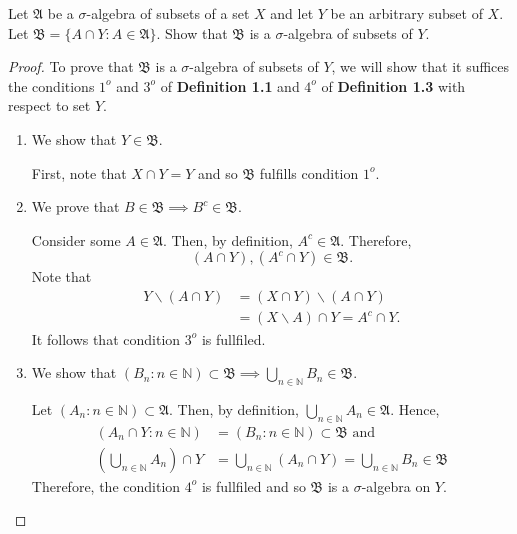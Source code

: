 \documentclass[12pt]{article}
\newcommand{\N}{\mathbb{N}}
\newenvironment{problem}[2][Problem]{\begin{trivlist}
		\item[\hskip \labelsep {\bfseries #1}\hskip \labelsep {\bfseries #2.}]}{\end{trivlist}}
\begin{document}
\begin{problem}{1.7}
	Let $\mathfrak{A}$ be a $\sigma$-algebra of subsets of a set $X$ and let $Y$ be an arbitrary subset of $X$. Let $\mathfrak{B} = \{A\cap Y : A\in \mathfrak{A}\}$. Show that $\mathfrak{B}$ is a $\sigma$-algebra of subsets of $Y$.
	\begin{proof}
	
		To prove that $\mathfrak{B}$ is a $\sigma$-algebra of subsets of $Y$, we will show that it suffices the conditions $1^{o}$ and $3^{o}$ of \textbf{Definition 1.1} and $4^{o}$ of \textbf{Definition 1.3} with respect to set $Y$.
		\begin{enumerate}
		\item We show that $Y\in \mathfrak{B}$.
		
		 First, note that $X\cap Y = Y$ and so $\mathfrak{B}$ fulfills condition $1^{o}$.\\
		
		\item We prove that $B\in \mathfrak{B} \implies B^{c} \in \mathfrak{B}$.
		
		Consider some $A\in \mathfrak{A}$. Then, by definition, $A^{c} \in \mathfrak{A}$. Therefore, 
		\begin{equation*}
		(A\cap Y), (A^{c}\cap Y) \in \mathfrak{B}.
		\end{equation*}
		 Note that 
		 \begin{align*}
		 	Y\backslash (A\cap Y)
		 	&= (X\cap Y)\backslash (A\cap Y)\\
		 	&= (X\backslash A)\cap Y = A^{c}\cap Y.
		 \end{align*} 
		 It follows that condition $3^{o}$ is fullfiled. 
		
		\item We show that $ (B_{n} : n\in \N)\subset \mathfrak{B} \implies \bigcup_{n\in \N} B_{n} \in \mathfrak{B}$.
		 
		Let $(A_{n}:n\in \N) \subset \mathfrak{A}$. Then, by definition, $\bigcup_{n\in \N} A_{n} \in \mathfrak{A}$. Hence,
		\begin{align*}
			(A_{n} \cap Y : n\in \N) &= (B_{n} : n\in \N) \subset \mathfrak{B} \text{ and}\\
			\left(\bigcup_{n\in \N} A_{n}\right) \cap Y &= \bigcup_{n\in \N} (A_{n} \cap Y) = \bigcup_{n\in \N} B_{n} \in \mathfrak{B}
		\end{align*}
	Therefore, the condition $4^{o}$ is fullfiled and so $\mathfrak{B}$ is a $\sigma$-algebra on $Y$.
	\end{enumerate}
	\end{proof} 
	

\end{problem}
\end{document}
